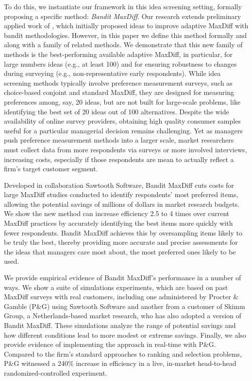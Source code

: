 \documentclass[blindrev]{informs3} %
\begin{document}
To do this, we instantiate our framework in this idea screening setting, formally proposing a specific method: \emph{Bandit MaxDiff}. Our research extends preliminary applied work of \cite{fairchildetal2015banditmaxdiff}, which initially proposed ideas to improve adaptive MaxDiff with bandit methodologies. However, in this paper we define this method formally and along with a family of related methods. We demonstrate that this new family of methods is the best-performing available adaptive MaxDiff, in particular, for large numbers ideas (e.g., at least 100) and for ensuring robustness to changes during surveying (e.g., non-representative early respondents). While idea screening methods typically involve preference measurement surveys, such as choice-based conjoint and standard MaxDiff, they are designed for measuring preferences among, say, 20 ideas, but are not built for large-scale problems, like identifying the best set of 20 ideas out of 100 alternatives. Despite the wide availability of online survey providers, obtaining high quality consumer samples useful for a particular managerial decision remains challenging. Yet as managers push preference measurement methods into a larger scale, market researchers must collect data from more respondents via surveys or more involved interviews, increasing costs, especially if those respondents are mean to actually reflect a firm's target customer segment.

Developed in collaboration Sawtooth Software, Bandit MaxDiff cuts costs for large MaxDiff studies conducted to identify respondents’ most preferred items, allowing the potential savings of millions of dollars in market research budgets. We show the new method can increase efficiency 2.5 to 4 times over current MaxDiff practices by accurately identifying the best items more quickly with fewer respondents. Bandit MaxDiff achieves this by oversampling items likely to be truly the best, thereby providing more accurate and precise assessments for the ideas that managers care most about, the most preferred ones likely to be used. 

We provide empirical evidence of Bandit MaxDiff's performance in a number of ways. We show a suite of simulations experiments, which are based on past MaxDiff surveys with real customers, including one administered by Procter \& Gamble (P\&G) using Sawtooth Software \citep{fairchildetal2015banditmaxdiff} and another from a customer of Skimm Group, a Netherlands-based market research, who has also adopted a version of Bandit MaxDiff. These simulations analyze the range of potential savings and how different conditions lead to more modest or extreme savings. Finally, we also provide evidence of implementing the approach in real-time with P\&G. Compared to the firm's standard approaches to ranking and selection problems, P\&G witnessed a 240\% increase in efficiency in a live, in-market head-to-head randomized-controlled experiment.
\end{document}
